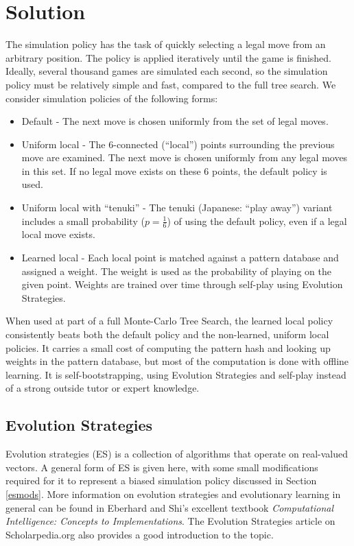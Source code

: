 \documentclass[11pt]{report}
\begin{document}
\section{Solution}\label{solution}
The simulation policy has the task of quickly selecting a legal move from an arbitrary position. The policy is applied iteratively until the game is finished. Ideally, several thousand games are simulated each second, so the simulation policy must be relatively simple and fast, compared to the full tree search. We consider simulation policies of the following forms:
\begin{itemize}
	\item{Default} - The next move is chosen uniformly from the set of legal moves.
	\item{Uniform local} - The 6-connected (``local'') points surrounding the previous move are examined. The next move is chosen uniformly from any legal moves in this set. If no legal move exists on these 6 points, the default policy is used.
	\item{Uniform local with ``tenuki''} - The tenuki (Japanese: ``play away'') variant includes a small probability ($p=\frac{1}{6}$) of using the default policy, even if a legal local move exists.
	\item{Learned local} - Each local point is matched against a pattern database and assigned a weight. The weight is used as the probability of playing on the given point. Weights are trained over time through self-play using Evolution Strategies.
\end{itemize}

When used at part of a full Monte-Carlo Tree Search, the learned local policy consistently beats both the default policy and the non-learned, uniform local policies. It carries a small cost of computing the pattern hash and looking up weights in the pattern database, but most of the computation is done with offline learning. It is self-bootstrapping, using Evolution Strategies and self-play instead of a strong outside tutor or expert knowledge.

\subsection{Evolution Strategies}\label{estrats}
Evolution strategies (ES) is a collection of algorithms that operate on real-valued vectors. A general form of ES is given here, with some small modifications required for it to represent a biased simulation policy discussed in Section \ref{esmods}. More information on evolution strategies and evolutionary learning in general can be found in Eberhard and Shi's excellent textbook \emph{Computational Intelligence: Concepts to Implementations}\cite{eberhart2007computational}. The Evolution Strategies article on Scholarpedia.org also provides a good introduction to the topic\cite{Beyer:2007}.
\end{document}
